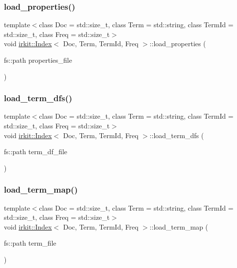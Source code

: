 \subsubsection{\texorpdfstring{load\+\_\+properties()}{load\_properties()}}
{\footnotesize\ttfamily template$<$class Doc  = std\+::size\+\_\+t, class Term  = std\+::string, class Term\+Id  = std\+::size\+\_\+t, class Freq  = std\+::size\+\_\+t$>$ \\
void \mbox{\hyperlink{classirkit_1_1Index}{irkit\+::\+Index}}$<$ Doc, Term, Term\+Id, Freq $>$\+::load\+\_\+properties (\begin{DoxyParamCaption}\item[{fs\+::path}]{properties\+\_\+file }\end{DoxyParamCaption})\hspace{0.3cm}{\ttfamily [inline]}}

\mbox{\label{classirkit_1_1Index_af8a4dd64292b2b7f7359ef1e62d75147}} 
\subsubsection{\texorpdfstring{load\+\_\+term\+\_\+dfs()}{load\_term\_dfs()}}
{\footnotesize\ttfamily template$<$class Doc  = std\+::size\+\_\+t, class Term  = std\+::string, class Term\+Id  = std\+::size\+\_\+t, class Freq  = std\+::size\+\_\+t$>$ \\
void \mbox{\hyperlink{classirkit_1_1Index}{irkit\+::\+Index}}$<$ Doc, Term, Term\+Id, Freq $>$\+::load\+\_\+term\+\_\+dfs (\begin{DoxyParamCaption}\item[{fs\+::path}]{term\+\_\+df\+\_\+file }\end{DoxyParamCaption})\hspace{0.3cm}{\ttfamily [inline]}}

\mbox{\label{classirkit_1_1Index_a2071c83ea3a4f128ea624fea8a24c9c9}} 
\subsubsection{\texorpdfstring{load\+\_\+term\+\_\+map()}{load\_term\_map()}}
{\footnotesize\ttfamily template$<$class Doc  = std\+::size\+\_\+t, class Term  = std\+::string, class Term\+Id  = std\+::size\+\_\+t, class Freq  = std\+::size\+\_\+t$>$ \\
void \mbox{\hyperlink{classirkit_1_1Index}{irkit\+::\+Index}}$<$ Doc, Term, Term\+Id, Freq $>$\+::load\+\_\+term\+\_\+map (\begin{DoxyParamCaption}\item[{fs\+::path}]{term\+\_\+file }\end{DoxyParamCaption})\hspace{0.3cm}{\ttfamily [inline]}}

